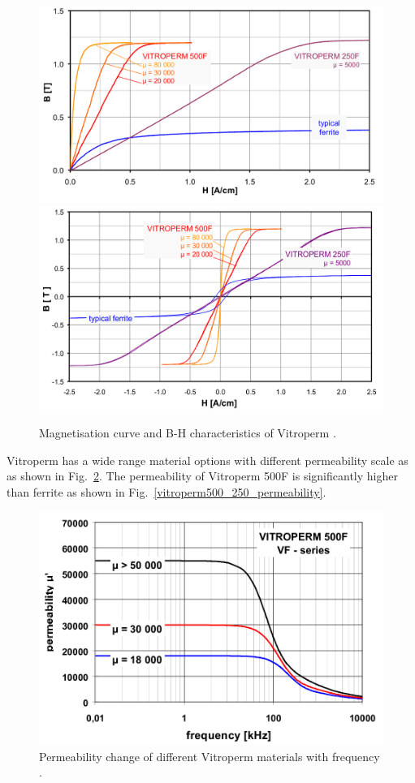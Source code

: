 \documentclass[a4paper, 11pt]{article} %
\begin{document}
\begin{figure}[]
  \centering
    \includegraphics[scale=0.3]{vitroperm_magnetization}
    \includegraphics[scale=0.3]{vitroterm_hysteresis}
    \caption{Magnetisation curve and B-H characteristics of Vitroperm \cite{vitroterm_manual}.}
  \label{vitroterm_BH}
\end{figure}

Vitroperm has a wide range material options with different permeability scale as as shown in Fig.~\ref{vitroterm_permeability}. 
The permeability of Vitroperm 500F is significantly higher than ferrite as shown in Fig.~\ref{vitroperm500_250_permeability}.

\begin{figure}[]
  \centering
    \includegraphics[scale=0.3]{vitroterm_permeability}
  \caption{Permeability change of different Vitroperm materials with frequency \cite{vitroterm_toroidal}.}
  \label{vitroterm_permeability}
\end{figure}
\end{document}
